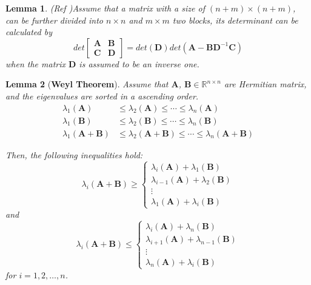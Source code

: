 \documentclass{elsarticle}
\newtheorem{lemma}{\textbf{Lemma } }
\begin{document}
\begin{lemma}(Ref \cite{zhang2017matrix})\label{detblocklemma}
	Assume that   a  matrix  with a  size  of  $(n+m) \times(n+m)$,   
	can be  further  divided  into      $ n \times n$  and     $m \times m$   two blocks,
	its  determinant  can be calculated by 
	\begin{equation}\label{detblock}
	det \left[\begin{array}{ll}
	\mathbf {A} & \mathbf {B} \\
	\mathbf {C} & \mathbf {D}
	\end{array}\right]
	=det  (\mathbf {D})
	det\left(\mathbf {A}-\mathbf {B} \mathbf {D}^{-1} \mathbf {C}\right)
	\end{equation}
	when  the  matrix  $\mathbf D$ is 
	assumed to be an  inverse one.
\end{lemma}




\begin{lemma}[\textbf{Weyl Theorem}]\label{weyltheo}
Assume  that 
$\mathbf A$, $\mathbf B \in \mathbb R^{n \times n}$ are Hermitian  matrix,  and  the  eigenvalues are  sorted  in  a  ascending  order. 
\begin{equation}
\begin{aligned}
\lambda_{1}(\mathbf{A}) & \le \lambda_{2}(\mathbf{A}) \le \cdots \le \lambda_{n}(\mathbf{A}) \\
\lambda_{1}(\mathbf{B}) & \le \lambda_{2}(\mathbf{B}) \le \cdots \le \lambda_{n}(\mathbf{B}) \\
\lambda_{1}(\mathbf{A}+\mathbf{B}) & \le \lambda_{2}(\mathbf{A}+\mathbf{B}) \le \cdots \le \lambda_{n}(\mathbf{A}+\mathbf{B})
\end{aligned}
\end{equation}

Then,  the  following  inequalities   hold:
\begin{equation}
\lambda_{i}(\mathbf{A}+\mathbf{B}) \geqslant\left\{\begin{array}{c}
\lambda_{i}(\mathbf{A})+\lambda_{1}(\mathbf{B}) \\
\lambda_{i-1}(\mathbf{A})+\lambda_{2}(\mathbf{B}) \\
\vdots \\
\lambda_{1}(\mathbf{A})+\lambda_{i}(\mathbf{B})
\end{array}\right.
\end{equation}
and 
\begin{equation}
\lambda_{i}(\mathbf A+\mathbf B) \le\left\{\begin{array}{c}
\lambda_{i}(\mathbf{A})+\lambda_{n}(\mathbf B) \\
\lambda_{i+1}(\mathbf{A})+\lambda_{n-1}(\mathbf{B}) \\
\vdots \\
\lambda_{n}(\mathbf{A})+\lambda_{i}(\mathbf{B})
\end{array}\right.
\end{equation}
for  $i=1,2,\dots, n$.
\end{lemma}
\end{document}
